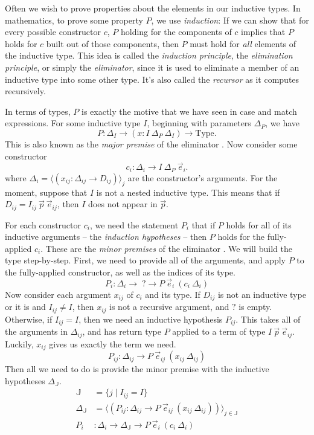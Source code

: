 \documentclass{report}
\newcommand{\const}[1]{\text{#1}}
\newcommand{\Type}{\const{Type}}
\begin{document}
Often we wish to prove properties about the elements in our inductive types. In mathematics, to prove some property $P$, we use \emph{induction}: If we can show that for every possible constructor $c$, $P$ holding for the components of $c$ implies that $P$ holds for $c$ built out of those components, then $P$ must hold for \emph{all} elements of the inductive type. This idea is called the \emph{induction principle}, the \emph{elimination principle}, or simply the \emph{eliminator}, since it is used to eliminate a member of an inductive type into some other type. It's also called the \emph{recursor} as it computes recursively.

In terms of types, $P$ is exactly the motive that we have seen in case and match expressions. For some inductive type $I$, beginning with parameters $\Delta_P$, we have $$P : \Delta_I \to (x : I ~ \Delta_P ~ \Delta_I) \to \Type.$$ This is also known as the \emph{major premise} of the eliminator \citep{inductive-families}. Now consider some constructor $$c_i : \Delta_{i} \to I ~ \Delta_P ~ \Vec{e}_i.$$ where $\Delta_i = \langle (x_{ij} : \Delta_{ij} \to D_{ij}) \rangle_j$ are the constructor's arguments. For the moment, suppose that $I$ is not a nested inductive type. This means that if $D_{ij} = I_{ij} ~ \Vec{p} ~ \Vec{e}_{ij}$, then $I$ does not appear in $\Vec{p}$.

For each constructor $c_i$, we need the statement $P_i$ that if $P$ holds for all of its inductive arguments -- the \emph{induction hypotheses} -- then $P$ holds for the fully-applied $c_i$. These are the \emph{minor premises} of the eliminator \citep{inductive-families}. We will build the type step-by-step. First, we need to provide all of the arguments, and apply $P$ to the fully-applied constructor, as well as the indices of its type. $$P_i: \Delta_i \to \; ? \to P ~ \Vec{e}_i ~ (c_i ~ \Delta_i)$$ Now consider each argument $x_{ij}$ of $c_i$ and its type. If $D_{ij}$ is not an inductive type or it is and $I_{ij} \neq I$, then $x_{ij}$ is not a recursive argument, and $?$ is empty. Otherwise, if $I_{ij} = I$, then we need an inductive hypothesis $P_{ij}$. This takes all of the arguments in $\Delta_{ij}$, and has return type $P$ applied to a term of type $I ~ \Vec{p} ~ \Vec{e}_{ij}$. Luckily, $x_{ij}$ gives us exactly the term we need. $$P_{ij}: \Delta_{ij} \to P ~ \Vec{e}_{ij} ~ (x_{ij} ~ \Delta_{ij})$$ Then all we need to do is provide the minor premise with the inductive hypotheses $\Delta_{\mathbb{J}}$.
%
\begin{align*}
    \mathbb{J} &= \{j \mid I_{ij} = I\} \\
    \Delta_{\mathbb{J}} &= \langle (P_{ij} : \Delta_{ij} \to P ~ \Vec{e}_{ij} ~ (x_{ij} ~ \Delta_{ij})) \rangle_{j \in \mathbb{J}} \\
    P_i &: \Delta_i \to \Delta_{\mathbb{J}} \to P ~ \Vec{e}_i ~ (c_i ~ \Delta_i)
\end{align*}
\end{document}
